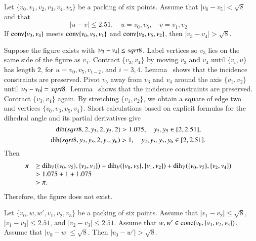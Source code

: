 \begin{tarskidata}
\begin{tarski}
\begin{lemma} 
Let $\{v_0,v_1,v_2,v_3,v_4,v_5\}$ be a packing of six points.
Assume that $|v_0-v_5|<\sqrt8$ and that
  $$|u-v| \le 2.51,\quad u=v_0,v_5,\quad v = v_1,v_2$$
If ${\operatorname{conv}}\{v_3,v_4\}$ meets 
${\operatorname{conv}}\{v_0,v_5,v_1\}$ and ${\operatorname{conv}}\{v_0,v_5,v_2\}$,
then $|v_3-v_4|>\sqrt8$.
\end{lemma}

\begin{proved}
Suppose the figure exists with $|v_3-v_4|\le sqrt8$. Label vertices
so $v_3$ lies on the same side of the figure as $v_1$. Contract
$\{v_3,v_4\}$ by moving $v_3$ and $v_4$ until
    $\{v_i,u\}$ has length $2$,
for $u=v_0,v_5,v_{i-2}$, and $i=3,4$. Lemma~ shows that the incidence constraints are preserved.
Pivot $v_5$ away from $v_3$ and
$v_4$ around the axis $\{v_1,v_2\}$ until
    $|v_5-v_0|=sqrt8$.  Lemma~ shows that the incidence constraints are preserved.
Contract $\{v_3,v_4\}$ again. By stretching $\{v_1,v_2\}$, we
obtain a square of edge two and vertices $\{v_0,v_3,v_5,v_4\}$. Short
calculations based on explicit formulas for the dihedral angle and
its partial derivatives give
    $$
        \operatorname{dih}(sqrt8,2,y_3,2,y_5,2) > 1.075,\quad
        y_3,y_5\in[2,2.51],
    $$
    $$
    \operatorname{dih}(sqrt8,y_2,y_3,2,y_5,y_6) >1,\quad
        y_2,y_3,y_5,y_6\in[2,2.51].
   $$
Then
$$
\begin{array}{lll}
 \pi &\ge \operatorname{dih}_V(\{v_0,v_5\},\{v_3,v_1\}) + \operatorname{dih}_V(\{v_0,v_5\},\{v_1,v_2\}) + 
\operatorname{dih}_V(\{v_0,v_5\},\{v_2,v_4\})\\
     &> 1.075 + 1 + 1.075 \\
     &> \pi .
\end{array}
$$
Therefore, the figure does not exist.
\swallowed\end{proved}
\end{tarski}










\begin{tarski}

\begin{lemma} 
Let $\{v_0,w,w',v_1,v_2,v_3\}$ be a packing of six points.
Assume that  $|v_1-v_2|\le\sqrt8$,
$|v_1-v_3|\le 2.51$, and $|v_2-v_3|\le 2.51$.
Assume that $w,w'\in{\operatorname{cone}}(v_0,\{v_1,v_2,v_3\})$.
Assume that $|v_0-w|\le\sqrt8$.  Then $|v_0-w'| > \sqrt8$.
\end{lemma}


\end{tarski}
\end{tarskidata}
